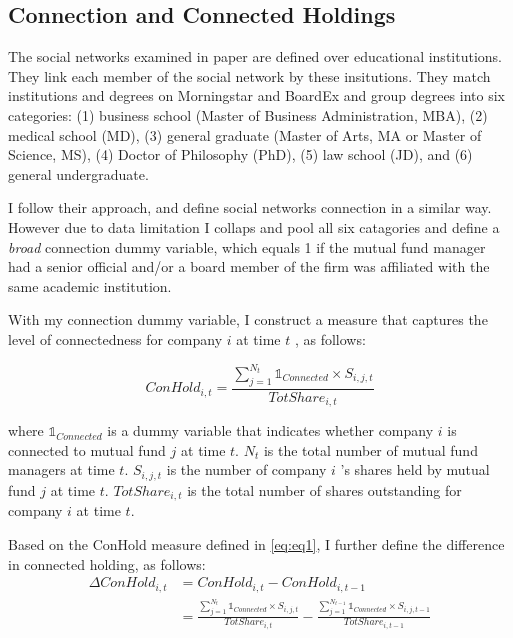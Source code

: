 \documentclass[11pt]{article}
\begin{document}
\begin{doublespace}
\subsection{Connection and Connected Holdings}
The social networks examined in \cite{cohen2008small} paper are defined over educational institutions. They link each member of the social network by these insitutions. They match institutions and degrees on Morningstar and BoardEx and group degrees into six categories: (1) business school (Master of Business Administration, MBA), (2) medical school (MD), (3) general graduate (Master of Arts, MA or Master of Science, MS), (4) Doctor of Philosophy (PhD), (5) law school (JD), and (6) general undergraduate. 

I follow their approach, and define social networks connection in a similar way. However due to data limitation I collaps and pool all six catagories and define a \emph{broad} connection dummy variable, which equals 1 if the mutual fund manager had a senior official and/or a board member of the firm was affiliated with the same academic institution. 

With my connection dummy variable, I construct a measure that captures the level of connectedness for company $i$ at time $t$ , as follows:

\begin{equation}
 ConHold_{i,t} = \frac{\sum_{j=1}^{N_t}\mathbb{1}_{Connected} \times S_{i,j,t}} {TotShare_{i,t}}
\label{eq:eq1}
\end{equation}

where $\mathbb{1}_{Connected}$ is a dummy variable that indicates whether company $i$ is connected to mutual fund $j$ at time $t$. $N_t$ is the total number of mutual fund managers at time $t$.  $S_{i,j,t}$ is the number of company $i$ 's shares held by mutual fund $j$ at time $t$. $TotShare_{i,t}$ is the total number of shares outstanding for company $i$ at time $t$. 

Based on the ConHold measure defined in \ref{eq:eq1}, I further define the difference in connected holding, as follows:
\begin{equation} \label{eq:eq2}
\begin{split}
 \Delta ConHold_{i,t} & = ConHold_{i,t} - ConHold_{i,t-1} \\
 & = \frac{\sum_{j=1}^{N_t}\mathbb{1}_{Connected} \times S_{i,j,t}} {TotShare_{i,t}}
 - \frac{\sum_{j=1}^{N_{t-1}}\mathbb{1}_{Connected} \times S_{i,j,t-1}} {TotShare_{i,t-1}}
\end{split}
\end{equation}


\end{doublespace}
\end{document}
